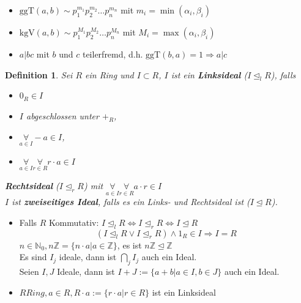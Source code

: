 \documentclass{article}
\newtheorem{defi}[thm]{Definition}
\newcommand{\N}{\mathbb{N}}
\newcommand{\Z}{\mathbb{Z}}
\newcommand{\ggT}{\text{ggT}}
\newcommand{\kgV}{\text{kgV}}
\begin{document}
\begin{itemize}
    \item
        $\ggT(a,b)\sim p_1^{m_1}p_2^{m_2}\hdots
        p_n^{m_n}$ mit $m_i=\min(\alpha_i,\beta_i)$
    \item
        $\kgV(a,b)\sim p_1^{M_1}p_2^{M_2}\hdots
        p_n^{M_n}$ mit $M_i=\max(\alpha_i,\beta_i)$
    \item
        $a|bc$ mit $b$ und $c$ teilerfremd, d.h.
        $\ggT(b,a)=1\Rightarrow a|c$
\end{itemize}
\begin{defi}
    Sei $R$ ein Ring und $I\subset R$, $I$ ist ein
    \textbf{Linksideal} ($I\unlhd_l R$), falls
    \begin{itemize}
        \item
            $0_R\in I$
        \item
            $I$ abgeschlossen unter $+_R$,
        \item
            $\underset{a\in I}\forall -a\in I$,
        \item
            $\underset{a\in I}\forall\underset{r\in R}
            \forall r\cdot a\in I$
    \end{itemize}
    \textbf{Rechtsideal} ($I\unlhd_r R$) mit $\underset
    {a\in I}\forall \underset{r\in R}\forall a\cdot r\in I$\\
    $I$ ist \textbf{zweiseitiges Ideal}, falls es ein Links-
    und Rechtsideal ist ($I\unlhd R$).\\
\end{defi}
\color{purple}
\begin{itemize}
    \item
        Falls $R$ Kommutativ: $I\unlhd_l R\Leftrightarrow
        I\unlhd_r R\Leftrightarrow I\unlhd R$\\
        \begin{equation*}
              (I\unlhd_l R\lor I\unlhd_r R)\land 1_R\in I
        \Rightarrow I=R
        \end{equation*}
        $n\in\N_0,n\Z=\{n\cdot a|a\in\Z\}$, es ist
        $n\Z\unlhd\Z$\\
        Es sind $I_j$ ideale, dann ist
        $\underset{j}\bigcap I_j$ auch ein Ideal.\\
        Seien $I,J$ Ideale, dann ist $I+J:=
        \{a+b|a\in I,b\in J\}$ auch ein Ideal.\\
    \item
        $R Ring,a\in R, R\cdot a:=\{r\cdot a|r\in R\}$ ist ein
        Linksideal
\end{itemize}
\end{document}
